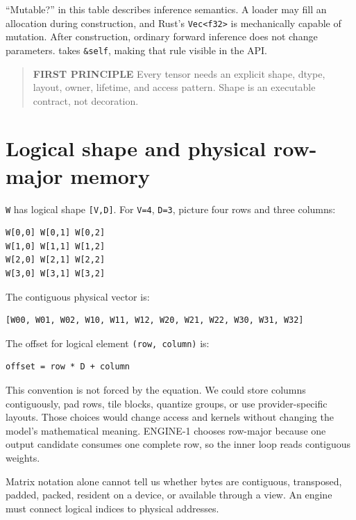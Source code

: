 ``Mutable?'' in this table describes inference semantics. A loader may
fill an allocation during construction, and Rust's
\texttt{Vec\textless{}f32\textgreater{}} is mechanically capable of
mutation. After construction, ordinary forward inference does not change
parameters. \texttt{} takes
\texttt{\&self}, making that rule visible in the API.

\begin{quote}
\textbf{FIRST PRINCIPLE} Every tensor needs an explicit shape, dtype,
layout, owner, lifetime, and access pattern. Shape is an executable
contract, not decoration.
\end{quote}

\section{Logical shape and physical row-major
memory}\label{logical-shape-and-physical-row-major-memory}

\texttt{W} has logical shape \texttt{{[}V,D{]}}. For \texttt{V=4},
\texttt{D=3}, picture four rows and three columns:

\begin{verbatim}
W[0,0] W[0,1] W[0,2]
W[1,0] W[1,1] W[1,2]
W[2,0] W[2,1] W[2,2]
W[3,0] W[3,1] W[3,2]
\end{verbatim}

The contiguous physical vector is:

\begin{verbatim}
[W00, W01, W02, W10, W11, W12, W20, W21, W22, W30, W31, W32]
\end{verbatim}

The offset for logical element \texttt{(row,\ column)} is:

\begin{verbatim}
offset = row * D + column
\end{verbatim}

This convention is not forced by the equation. We could store columns
contiguously, pad rows, tile blocks, quantize groups, or use
provider-specific layouts. Those choices would change access and kernels
without changing the model's mathematical meaning. ENGINE-1 chooses
row-major because one output candidate consumes one complete row, so the
inner loop reads contiguous weights.

Matrix notation alone cannot tell us whether bytes are contiguous,
transposed, padded, packed, resident on a device, or available through a
view. An engine must connect logical indices to physical addresses.

